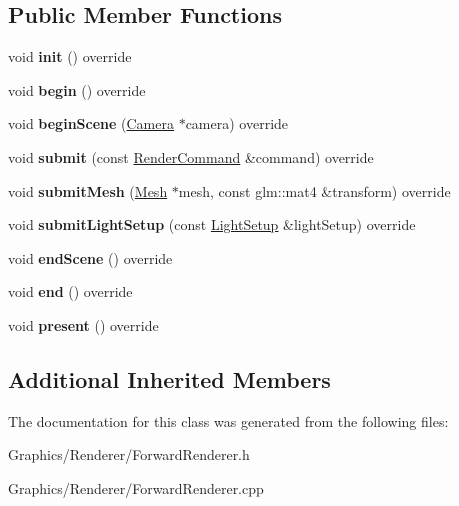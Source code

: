 \subsection*{Public Member Functions}
\begin{DoxyCompactItemize}
\item 
\mbox{\label{classce_1_1graphics_1_1_forward_renderer_ac6c7ad9a18ecfb2cbb6aee202e7e2e8f}} 
void {\bfseries init} () override
\item 
\mbox{\label{classce_1_1graphics_1_1_forward_renderer_a4550120dc1349b5298de4a02422c6c26}} 
void {\bfseries begin} () override
\item 
\mbox{\label{classce_1_1graphics_1_1_forward_renderer_ae84dbf0b5a71b464cf4fc34a5daac805}} 
void {\bfseries begin\+Scene} (\hyperlink{classce_1_1graphics_1_1_camera}{Camera} $\ast$camera) override
\item 
\mbox{\label{classce_1_1graphics_1_1_forward_renderer_a3fb15f85368a78834b9d25b98461916c}} 
void {\bfseries submit} (const \hyperlink{structce_1_1graphics_1_1_render_command}{Render\+Command} \&command) override
\item 
\mbox{\label{classce_1_1graphics_1_1_forward_renderer_abfb5f86e8b5c6a1824ab7a03838785fd}} 
void {\bfseries submit\+Mesh} (\hyperlink{classce_1_1graphics_1_1_mesh}{Mesh} $\ast$mesh, const glm\+::mat4 \&transform) override
\item 
\mbox{\label{classce_1_1graphics_1_1_forward_renderer_a32c92d13c2ba951f71552ea9cf15350c}} 
void {\bfseries submit\+Light\+Setup} (const \hyperlink{structce_1_1graphics_1_1_light_setup}{Light\+Setup} \&light\+Setup) override
\item 
\mbox{\label{classce_1_1graphics_1_1_forward_renderer_a34bf60e44a9a594ab596f46ca7688e3e}} 
void {\bfseries end\+Scene} () override
\item 
\mbox{\label{classce_1_1graphics_1_1_forward_renderer_a8a8c16a645e63fd54b932f62d96d805b}} 
void {\bfseries end} () override
\item 
\mbox{\label{classce_1_1graphics_1_1_forward_renderer_a19933a9015f2abbd27b398e7a6d697b6}} 
void {\bfseries present} () override
\end{DoxyCompactItemize}
\subsection*{Additional Inherited Members}


The documentation for this class was generated from the following files\+:\begin{DoxyCompactItemize}
\item 
Graphics/\+Renderer/Forward\+Renderer.\+h\item 
Graphics/\+Renderer/Forward\+Renderer.\+cpp\end{DoxyCompactItemize}
